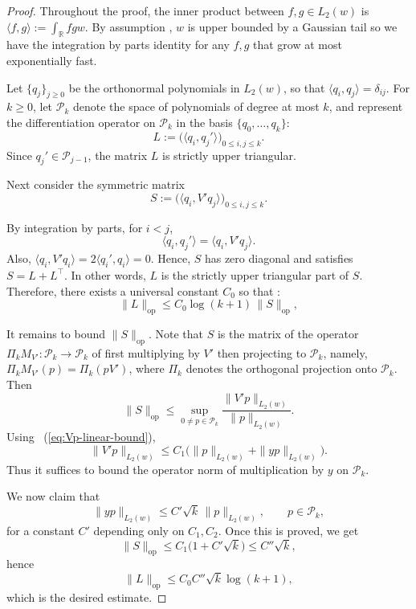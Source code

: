 \documentclass[letterpaper,11pt]{article}
\newcommand{\eqref}[1]{~(\ref{#1})}
\newcommand{\reals}{\mathbb{R}}
\newcommand{\calP}{{\mathcal{P}}}
\theoremstyle{definition}
\newcommand{\op}{\mathrm{op}}
\begin{document}
    \begin{proof}
Throughout the proof, the inner product between $f,g\in L_2(w)$ is
$\langle f,g\rangle := \int_{\reals} fg w$. 
By assumption , $w$ is upper bounded by a Gaussian tail so we have the integration by parts identity  for any $f,g$ that grow at most exponentially fast.
    
      Let $\{q_j\}_{j\ge 0}$ be the orthonormal polynomials in $L_2(w)$, so that $
        \langle q_i,q_j\rangle=\delta_{ij}$.
      For $k\ge 0$, let $\mathcal P_k$ denote the space of polynomials of degree at most $k$, and represent the differentiation operator on $\mathcal P_k$ in the basis $\{q_0,\dots,q_k\}$:
      \[
        L:=\bigl(\langle q_i,q_j'\rangle\bigr)_{0\le i,j\le k}.
      \]
      Since $q_j'\in \mathcal P_{j-1}$, the matrix $L$ is strictly upper triangular.

      Next consider the symmetric matrix
      \[
        S:=
        \bigl(\langle q_i,V' q_j\rangle\bigr)_{0\le i,j\le k}.
      \]

      By integration by parts, for $i<j$,
      \[
        \langle q_i,q_j'\rangle
        =
        \langle q_i,V' q_j\rangle.
      \]
      Also, $\langle q_i,V' q_i\rangle
        =
        2\langle q_i',q_i\rangle
        =0$. Hence, $S$ has zero diagonal and satisfies $S = L+L^\top$.
In other words, $L$ is the strictly upper triangular part of $S$. Therefore, there exists a universal constant $C_0$ so that
\cite{Bhatia2000}:
      \[
        \|L\|_{\op}
        \le
        C_0 \log(k+1)\,\|S\|_{\op},
      \]

      It remains to bound $\|S\|_{\op}$. Note that  $S$ is the matrix of the  operator
      $\Pi_k M_{V'}:\mathcal P_k\to \mathcal P_k$ of first multiplying by $V'$ then projecting to $\calP_k$, namely, 
      $\Pi_k M_{V'}(p) = \Pi_k (pV')$, where
      $\Pi_k$ denotes the orthogonal projection onto $\mathcal P_k$. Then
      \[
        \|S\|_{\op}
        \le
        \sup_{0\ne p\in \mathcal P_k}\frac{\|V' p\|_{L_2(w)}}{\|p\|_{L_2(w)}}.
      \]
      Using \eqref{eq:Vp-linear-bound},
      \[
        \|V' p\|_{L_2(w)}
        \le
        C_1\bigl(\|p\|_{L_2(w)}+\|y p\|_{L_2(w)}\bigr).
      \]
      Thus it suffices to bound the operator norm of multiplication by $y$ on $\mathcal P_k$.

      We now claim that
      \begin{equation}\label{eq:y-mult-bound}
        \|y p\|_{L_2(w)}
        \le
        C'\sqrt{k}\,\|p\|_{L_2(w)},
        \qquad p\in \mathcal P_k,
      \end{equation}
      for a constant $C'$ depending only on $C_1,C_2$. Once this is proved, we get
      \[
        \|S\|_{\op}
        \le
        C_1\bigl(1+C'\sqrt{k}\bigr)
        \le
        C''\sqrt{k},
      \]
      hence
      \[
        \|L\|_{\op}
        \le
        C_0 C'' \sqrt{k}\log(k+1),
      \]
      which is the desired estimate.


\end{proof}
\end{document}
